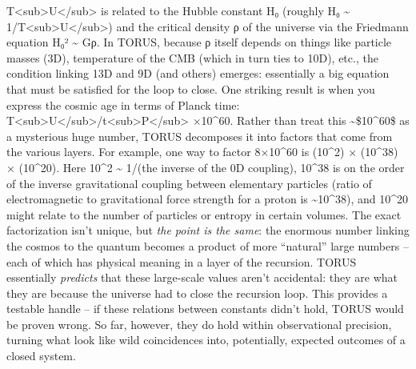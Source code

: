 \documentclass[
]{article}
\begin{document}
\begin{itemize}
  T\textless sub\textgreater U\textless/sub\textgreater{} is related to
  the Hubble constant H₀ (roughly H₀ \textasciitilde{}
  1/T\textless sub\textgreater U\textless/sub\textgreater) and the
  critical density ρ of the universe via the Friedmann equation H₀²
  \textasciitilde{} Gρ\hspace{0pt}. In TORUS, because ρ itself depends
  on things like particle masses (3D), temperature of the CMB (which in
  turn ties to 10D), etc., the condition linking 13D and 9D (and others)
  emerges: essentially a big equation that must be satisfied for the
  loop to close. One striking result is when you express the cosmic age
  in terms of Planck time:
  T\textless sub\textgreater U\textless/sub\textgreater/t\textless sub\textgreater P\textless/sub\textgreater{}
  ×10\^{}60\hspace{0pt}. Rather than treat this
  \textasciitilde\$10\^{}60\$ as a mysterious huge number, TORUS
  decomposes it into factors that come from the various
  layers\hspace{0pt}. For example, one way to factor 8×10\^{}60 is
  (10\^{}2) × (10\^{}38) × (10\^{}20)\hspace{0pt}. Here 10\^{}2
  \textasciitilde{} 1/\alpha (the inverse of the 0D coupling), 10\^{}38 is on
  the order of the inverse gravitational coupling between elementary
  particles (ratio of electromagnetic to gravitational force strength
  for a proton is \textasciitilde10\^{}38), and 10\^{}20 might relate to
  the number of particles or entropy in certain volumes\hspace{0pt}. The
  exact factorization isn't unique, but \emph{the point is the same}:
  the enormous number linking the cosmos to the quantum becomes a
  product of more ``natural'' large numbers -- each of which has
  physical meaning in a layer of the recursion\hspace{0pt}. TORUS
  essentially \emph{predicts} that these large-scale values aren't
  accidental: they are what they are because the universe had to close
  the recursion loop. This provides a testable handle -- if these
  relations between constants didn't hold, TORUS would be proven
  wrong\hspace{0pt}. So far, however, they do hold within observational
  precision, turning what look like wild coincidences into, potentially,
  expected outcomes of a closed system.
\end{itemize}
\end{document}
